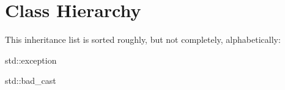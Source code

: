\section{Class Hierarchy}
This inheritance list is sorted roughly, but not completely, alphabetically\+:\begin{DoxyCompactList}
\item {}
\item std\+:\+:exception\begin{DoxyCompactList}
\item std\+:\+:bad\+\_\+cast\begin{DoxyCompactList}
\item {}
\end{DoxyCompactList}
\end{DoxyCompactList}
\item {}
\end{DoxyCompactList}
